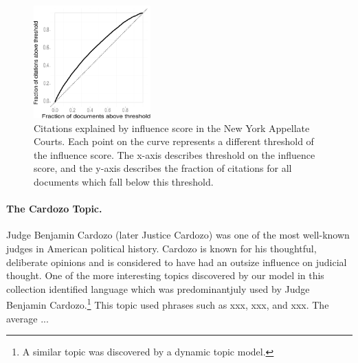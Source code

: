 \begin{figure}
  \center
  \includegraphics[width=0.4\textwidth]{chapter_influence/figures/fraction_docs_vs_fraction_citations.pdf}
  \caption{Citations explained by influence score in the New York Appellate Courts.  Each point on the curve represents a different threshold of the influence score.  The x-axis describes threshold on the influence score, and the y-axis describes the fraction of citations for all documents which fall below this threshold.}
  \label{figure:nyca_citations_explained}
\end{figure}



\paragraph{The Cardozo Topic.} Judge Benjamin Cardozo (later Justice
Cardozo) was one of the most well-known judges in American political
history.  Cardozo is known for his thoughtful, deliberate opinions and
is considered to have had an outsize influence on judicial thought.
One of the more interesting topics discovered by our model in this
collection identified language which was predominantjuly used by Judge
Benjamin Cardozo.\footnote{A similar topic was discovered by a dynamic
  topic model.}  This topic used phrases such as xxx, xxx, and
xxx. The average ...
